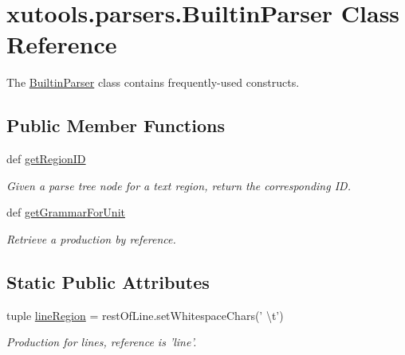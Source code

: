 \hypertarget{classxutools_1_1parsers_1_1_builtin_parser}{\section{xutools.\-parsers.\-Builtin\-Parser Class Reference}
\label{classxutools_1_1parsers_1_1_builtin_parser}
}


The \hyperlink{classxutools_1_1parsers_1_1_builtin_parser}{Builtin\-Parser} class contains frequently-\/used constructs.  


\subsection*{Public Member Functions}
\begin{DoxyCompactItemize}
\item 
def \hyperlink{classxutools_1_1parsers_1_1_builtin_parser_abe8119b777818e88da1670babca58494}{get\-Region\-I\-D}
\begin{DoxyCompactList}\small\item\em Given a parse tree node for a text region, return the corresponding I\-D. \end{DoxyCompactList}\item 
def \hyperlink{classxutools_1_1parsers_1_1_builtin_parser_ab68a04dc8b0eb93984418b76989ffac0}{get\-Grammar\-For\-Unit}
\begin{DoxyCompactList}\small\item\em Retrieve a production by reference. \end{DoxyCompactList}\end{DoxyCompactItemize}
\subsection*{Static Public Attributes}
\begin{DoxyCompactItemize}
\item 
\hypertarget{classxutools_1_1parsers_1_1_builtin_parser_ae151c98d03cc27876a18d44ded16f4ba}{tuple \hyperlink{classxutools_1_1parsers_1_1_builtin_parser_ae151c98d03cc27876a18d44ded16f4ba}{line\-Region} = rest\-Of\-Line.\-set\-Whitespace\-Chars(' \textbackslash{}t')}\label{classxutools_1_1parsers_1_1_builtin_parser_ae151c98d03cc27876a18d44ded16f4ba}

\begin{DoxyCompactList}\small\item\em Production for lines, reference is 'line'. \end{DoxyCompactList}\end{DoxyCompactItemize}


